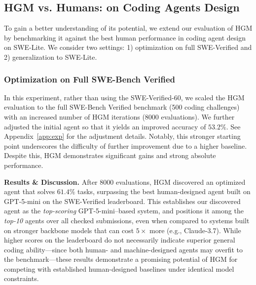 \documentclass{article} %
\begin{document}
\subsection{HGM vs. Humans: on Coding Agents Design}
\label{exp:vs-human}
To gain a better understanding of its potential, we extend our evaluation of HGM by benchmarking it against the best human performance in coding agent design on SWE-Lite. We consider two settings: 1) optimization on full SWE-Verified and 2) generalization to SWE-Lite.

\subsubsection{Optimization on Full SWE-Bench Verified} \label{exp:vs-human-verified}
In this experiment, rather than using the SWE-Verified-60, we scaled the HGM evaluation to the full SWE-Bench Verified benchmark (500 coding challenges) with an increased number of HGM iterations (8000 evaluations). 
We further adjusted the initial agent so that it yields an improved accuracy of $53.2\%$. See Appendix~\ref{app:exp} for the adjustment details.
Notably, this stronger starting point underscores the difficulty of further improvement due to a higher baseline. Despite this, HGM demonstrates significant gains and strong absolute performance.

\textbf{Results \& Discussion.} After 8000 evaluations, HGM discovered an optimized agent that solves $61.4\%$ tasks, surpassing the best human-designed agent built on GPT-5-mini on the SWE-Verified leaderboard. This establishes our discovered agent as the \textit{top-scoring} GPT-5-mini–based system, and positions it among the \textit{top-10} agents over all checked submissions, even when compared to systems built on stronger backbone models that can cost $5\times$ more (e.g., Claude-3.7). While higher scores on the leaderboard do not necessarily indicate superior general coding ability---since both human- and machine-designed agents may overfit to the benchmark---these results demonstrate a promising potential of HGM for competing with established human-designed baselines under identical model constraints. 
\end{document}
